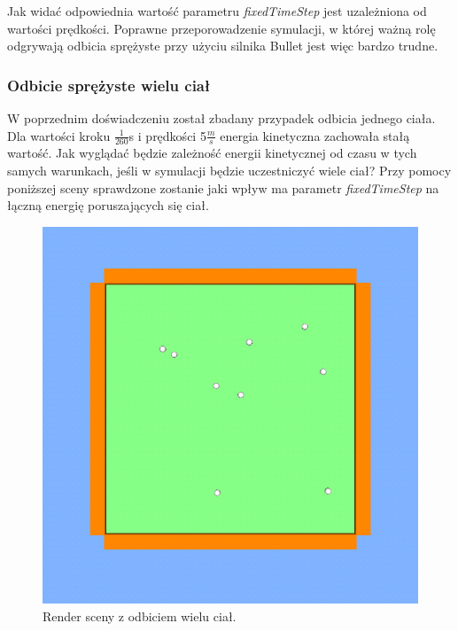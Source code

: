 Jak widać odpowiednia wartość parametru \emph{fixedTimeStep} jest uzależniona od
wartości prędkości. Poprawne przeporowadzenie symulacji, w
której ważną rolę odgrywają odbicia sprężyste przy użyciu silnika Bullet jest
więc bardzo trudne.

\newpage
\subsubsection{Odbicie sprężyste wielu ciał}\label{sec:odbicieWieluCial}

W poprzednim doświadczeniu został zbadany przypadek odbicia jednego ciała.
Dla wartości kroku $ \frac{1}{260} $s i prędkości 5$ \frac{m}{s} $ energia
kinetyczna zachowała stałą wartość. Jak wyglądać będzie zależność energii
kinetycznej od czasu w tych samych warunkach, jeśli w symulacji będzie
uczestniczyć wiele ciał? Przy pomocy poniższej sceny sprawdzone zostanie jaki
wpływ ma parametr \emph{fixedTimeStep} na łączną energię poruszających się ciał.

\begin{figure}[H]
\centering
\includegraphics[scale = 0.5]{./img/shot_2.png}
\caption{Render sceny z odbiciem wielu ciał.}
\label{fig:shot_2}
\end{figure}


  
